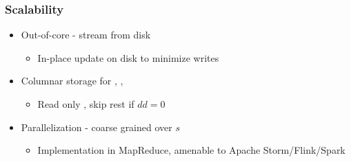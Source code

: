 \begin{frame}
  \frametitle{Scalability}

  \begin{itemize}
    \item Out-of-core - stream \spdag from disk
    \begin{itemize}
      \item In-place update on disk to minimize writes
    \end{itemize}
    \item Columnar storage for \dist, \paths, \dep
    \begin{itemize}
      \item Read only \dist, skip rest if $dd=0$
    \end{itemize}
    \item Parallelization - coarse grained over $s$
    \begin{itemize}
      \item Implementation in MapReduce, amenable to Apache Storm/Flink/Spark
    \end{itemize}
  \end{itemize}

\end{frame}


